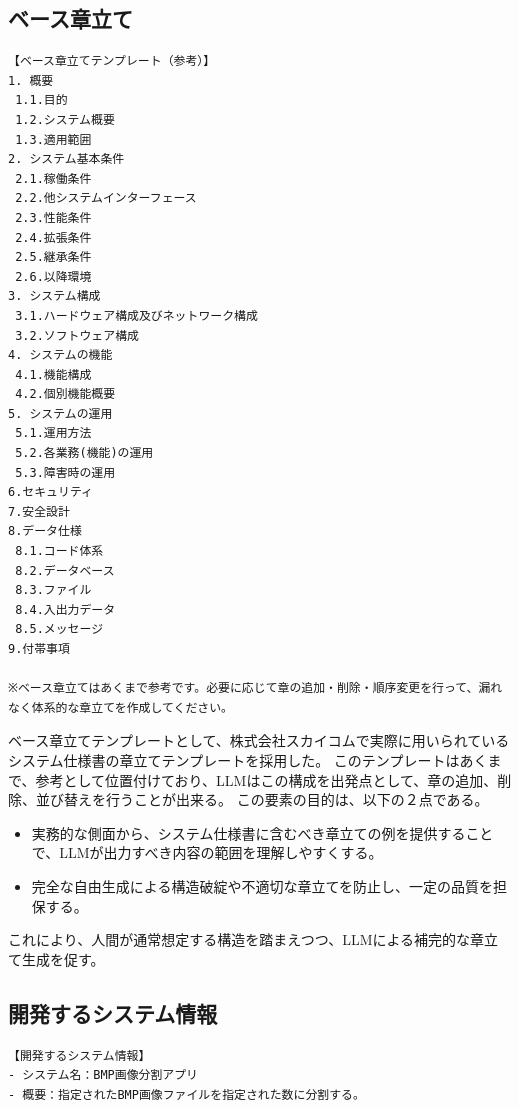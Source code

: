 \subsection{ベース章立て}
\begin{tcolorbox}[
  colback=white,
  colframe=black,
  fonttitle=\bfseries,
  breakable
]
\footnotesize
\ttfamily
\fontsize{11}{12}\selectfont
\begin{verbatim}
【ベース章立てテンプレート（参考）】
1. 概要
 1.1.目的
 1.2.システム概要
 1.3.適用範囲
2. システム基本条件
 2.1.稼働条件
 2.2.他システムインターフェース
 2.3.性能条件
 2.4.拡張条件
 2.5.継承条件
 2.6.以降環境
3. システム構成
 3.1.ハードウェア構成及びネットワーク構成
 3.2.ソフトウェア構成
4. システムの機能
 4.1.機能構成
 4.2.個別機能概要
5. システムの運用
 5.1.運用方法
 5.2.各業務(機能)の運用
 5.3.障害時の運用
6.セキュリティ
7.安全設計
8.データ仕様
 8.1.コード体系
 8.2.データベース
 8.3.ファイル
 8.4.入出力データ
 8.5.メッセージ
9.付帯事項

※ベース章立てはあくまで参考です。必要に応じて章の追加・削除・順序変更を行って、漏れなく体系的な章立てを作成してください。
\end{verbatim}
\end{tcolorbox}
\par\vspace{-20pt}
\label{fig:base_outline}
ベース章立てテンプレートとして、株式会社スカイコムで実際に用いられているシステム仕様書の章立てテンプレートを採用した。
このテンプレートはあくまで、参考として位置付けており、LLMはこの構成を出発点として、章の追加、削除、並び替えを行うことが出来る。
この要素の目的は、以下の２点である。
\begin{itemize}
  \item 実務的な側面から、システム仕様書に含むべき章立ての例を提供することで、LLMが出力すべき内容の範囲を理解しやすくする。
  \item 完全な自由生成による構造破綻や不適切な章立てを防止し、一定の品質を担保する。
\end{itemize}
これにより、人間が通常想定する構造を踏まえつつ、LLMによる補完的な章立て生成を促す。
\subsection{開発するシステム情報}

\begin{tcolorbox}[
  colback=white,
  colframe=black,
  fonttitle=\bfseries,
  breakable
]
\footnotesize
\ttfamily
\fontsize{11}{12}\selectfont
\begin{verbatim}
【開発するシステム情報】
- システム名：BMP画像分割アプリ
- 概要：指定されたBMP画像ファイルを指定された数に分割する。
\end{verbatim}
\end{tcolorbox}
\par\vspace{-20pt}
\label{fig:development_system_info}

